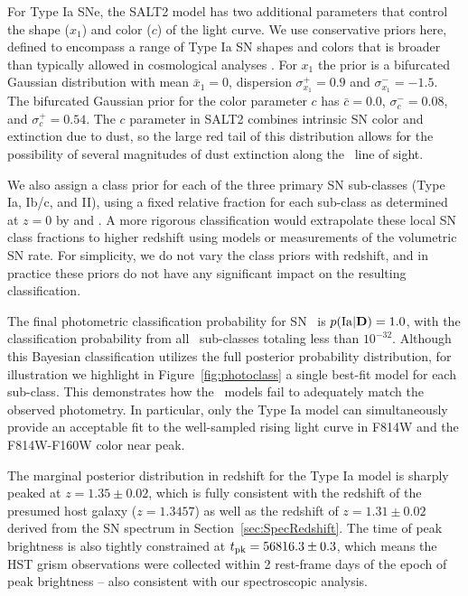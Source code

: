 For Type Ia SNe, the SALT2 model has two additional parameters that
control the shape ($x_1$) and color ($c$) of the light curve.  We use
conservative priors here, defined to encompass a range of Type Ia SN
shapes and colors that is broader than typically allowed in
cosmological analyses \citep[see
e.g.,][]{Kessler:2009b,Sullivan:2011,Rest:2014}. For $x_1$ the prior
is a bifurcated Gaussian distribution with mean $\bar{x}_1=0$,
dispersion $\sigma_{x_1}^+={0.9}$ and $\sigma_{x_1}^-={-1.5}$.  The
bifurcated Gaussian prior for the color parameter $c$ has
$\bar{c}=0.0$, $\sigma_c^-=0.08$, and $\sigma_c^+=0.54$.  The $c$
parameter in SALT2 combines intrinsic SN color and extinction due to
dust, so the large red tail of this distribution allows for the
possibility of several magnitudes of dust extinction along the \tomas\
line of sight.

We also assign a class prior for each of the three primary SN
sub-classes (Type Ia, Ib/c, and II), using a fixed relative fraction for
each sub-class as determined at $z=0$ by \citet{Smartt:2009}
and \citet{Li:2011a}.  A more rigorous classification would extrapolate
these local SN class fractions to higher redshift using models or
measurements of the volumetric SN rate.  For simplicity, we do not
vary the class priors with redshift, and in practice these priors do
not have any significant impact on the resulting classification.

The final photometric classification probability for SN \tomas\ is
$p({\rm Ia}|{\rm {\bf D}})=1.0$, with the classification probability
from all \CCSN\ sub-classes totaling less than
$10^{-32}$.  Although this Bayesian classification utilizes
the full posterior probability distribution, for illustration we
highlight in Figure~\ref{fig:photoclass} a single best-fit model for
each sub-class. This demonstrates how the \CCSN\ models fail to
adequately match the observed photometry. In particular, only the Type
Ia model can simultaneously provide an acceptable fit to the
well-sampled rising light curve in F814W and the F814W-F160W color
near peak.

The marginal posterior distribution in redshift for the Type Ia model
is sharply peaked at $z=1.35\pm0.02$, which is fully
consistent with the redshift of the presumed host galaxy ($z=1.3457$)
as well as the redshift of $z=1.31\pm0.02$ derived from the SN
spectrum in Section~\ref{sec:SpecRedshift}.  The time of peak
brightness is also tightly constrained at $t_{\rm pk}=56816.3\pm0.3$,
which means the HST grism observations were collected within 2
rest-frame days of the epoch of peak brightness -- also consistent
with our spectroscopic analysis.


